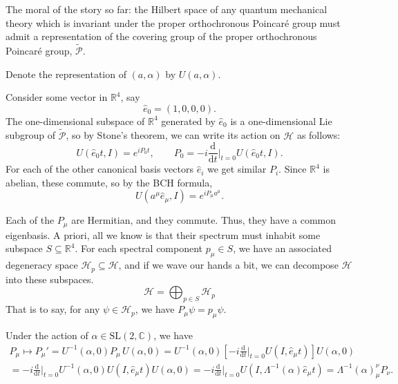 \documentclass[a4paper,10pt]{scrreprt}
\newcommand{\tder}[2]{\frac{\text{d} #1}{\text{d} #2}}
\newcommand{\R}{\mathbb{R}}
\newcommand{\C}{\mathbb{C}}
\newcommand{\SL}{\mathrm{SL}}
\theoremstyle{definition}
\theoremstyle{plain}
\theoremstyle{remark}
\begin{document}
The moral of the story so far: the Hilbert space of any quantum mechanical theory which is invariant under the proper orthochronous Poincar{\'e} group must admit a representation of the covering group of the proper orthochronous Poincar{\'e} group, $\widetilde{\mathcal{P}}$.

Denote the representation of $(a, \alpha)$ by $U(a, \alpha)$.

Consider some vector in $\R^{4}$, say
\begin{equation*}
  \hat{e}_{0} = (1,0,0,0).
\end{equation*}
The one-dimensional subspace of $\R^{4}$ generated by $\hat{e}_{0}$ is a one-dimensional Lie subgroup of $\widetilde{\mathcal{P}}$, so by Stone's theorem, we can write its action on $\mathscr{H}$ as follows:
\begin{equation*}
  U(\hat{e}_{0} t, I) = e^{i P_{0} t},\qquad P_{0} = -i \tder{}{t}\bigg|_{t=0} U(\hat{e}_{0} t, I).
\end{equation*}
For each of the other canonical basis vectors $\hat{e}_{i}$ we get similar $P_{i}$. Since $\R^4$ is abelian, these commute, so by the BCH formula,
\begin{equation*}
  U(a^{\mu} \hat{e}_{\mu}, I) = e^{i P_{\mu} a^{\mu}}.
\end{equation*}

Each of the $P_{\mu}$ are Hermitian, and they commute. Thus, they have a common eigenbasis. A priori, all we know is that their spectrum must inhabit some subspace $S \subseteq \R^{4}$. For each spectral component $p_{\mu} \in S$, we have an associated degeneracy space $\mathscr{H}_{p} \subseteq \mathscr{H}$, and if we wave our hands a bit, we can decompose $\mathscr{H}$ into these subspaces.
\begin{equation*}
  \mathscr{H} = \bigoplus_{p \in S} \mathscr{H}_{p}
\end{equation*}
That is to say, for any $\psi \in \mathscr{H}_{p}$, we have $P_{\mu}\psi = p_{\mu}\psi$.

Under the action of $\alpha \in \SL(2, \C)$, we have
\begin{multline*}
  P_\mu \mapsto P_{\mu}' = U^{-1}(\alpha,0) P_\mu\, U(\alpha,0) = U^{-1}(\alpha,0)\left[-i\tder{}{t}\biggr|_{t=0} U(I, \hat{e}_\mu t)\right]U(\alpha,0)\\ = -i\tder{}{t}\biggr|_{t=0}U^{-1}(\alpha,0) U(I, \hat{e}_\mu t)U(\alpha,0) = -i\tder{}{t}\biggr|_{t=0}U\left(I,\Lambda^{-1}(\alpha)\hat{e}_\mu t\right) = \Lambda^{-1}(\alpha)^\nu_\mu P_\nu.
\end{multline*}
\end{document}
